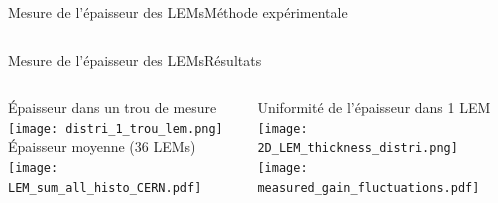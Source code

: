 \begin{frame}{Mesure de l'épaisseur des LEMs}{Méthode expérimentale}
\begin{scriptsize}
\begin{columns}
\begin{column}{0.5\textwidth}
    			\end{column}
    		\end{columns}
    	\end{scriptsize}
    \end{frame}

    \begin{frame}{Mesure de l'épaisseur des LEMs}{Résultats}
    	\begin{scriptsize}
    		\begin{columns}
    			\begin{column}{0.48\textwidth}
    				\centering
    				Épaisseur dans un trou de mesure\\
    				\centering
    				\texttt{[image: distri\_1\_trou\_lem.png]}\\
    				\vspace{0.15cm}
    				\centering
    				Épaisseur moyenne (36 LEMs)\\
    				\texttt{[image: LEM\_sum\_all\_histo\_CERN.pdf]}
    			\end{column}
    			\hfill
    			\begin{column}{0.48\textwidth}
    				\centering
    				Uniformité de l'épaisseur dans 1 LEM\\
    				\centering
    				\texttt{[image: 2D\_LEM\_thickness\_distri.png]}\\
    				\vspace{0.15cm}
    				\centering
    				\texttt{[image: measured\_gain\_fluctuations.pdf]}
    			\end{column}
    		\end{columns}
    	\end{scriptsize}
    \end{frame}



